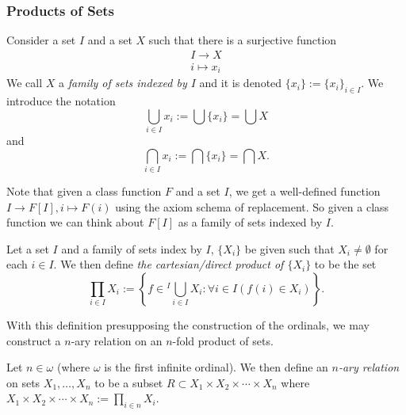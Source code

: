 \subsubsection{Products of Sets}
\begin{definition}
    Consider a set $I$ and a set $X$ such that there is a surjective function 
    \begin{gather*}
        I\rightarrow X\\
        i\mapsto x_i
    \end{gather*}
    We call $X$ a \textit{family of sets indexed by $I$} and it is denoted $\{x_i\}:=\{x_i\}_{i\in I}$. We introduce the notation
    $$\bigcup_{i\in I} x_i := \bigcup \{x_i\} = \bigcup X$$
    and 
    $$\bigcap_{i\in I} x_i := \bigcap \{x_i\} = \bigcap X.$$
\end{definition}
Note that given a class function $F$ and a set $I$, we get a well-defined function $I\rightarrow F[I], i\mapsto F(i)$ using the axiom schema of replacement. So given a class function we can think about $F[I]$ as a family of sets indexed by $I$. 
\begin{definition}
    Let a set $I$ and a family of sets index by $I$, $\{X_i\}$ be given such that $X_i\neq \emptyset$ for each $i\in I$. We then define \textit{the cartesian/direct product of $\{X_i\}$} to be the set
    $$\prod_{i\in I} X_i := \left\{f\in {}^I\!\bigcup_{i\in I} X_i : \forall i\in I(f(i)\in X_i)\right\}.$$  
\end{definition}
With this definition presupposing the construction of the ordinals, we may construct a $n$-ary relation on an $n$-fold product of sets.
\begin{definition}
    Let $n\in \omega$ (where $\omega$ is the first infinite ordinal). We then define an \textit{$n$-ary relation} on sets $X_1,\dots,X_n$ to be a subset $R\subset X_1\times X_2\times \cdots \times X_n$ where $X_1\times X_2\times \cdots \times X_n:= \prod_{i\in n} X_i$.
\end{definition}
